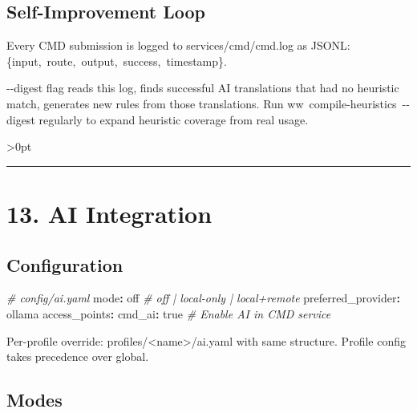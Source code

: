 \documentclass[11pt, a4paper, DIV=14]{scrartcl}
\renewcommand{\texttt}[1]{{\ttfamily\fontsize{8.5}{10.5}\selectfont\color{BabbNavy}#1}}
\newenvironment{Shaded}{%
  \vspace{4pt}%
  \begin{lrbox}{\ShadedBox}%
  \begin{minipage}{\dimexpr\linewidth-2\fboxsep\relax}%
  \vspace{4pt}%
}{%
  \vspace{4pt}%
  \end{minipage}%
  \end{lrbox}%
  \noindent\colorbox{CodeBg}{\usebox{\ShadedBox}}%
  \par\vspace{4pt}%
}
\newcommand{\AttributeTok}[1]{\textcolor{BabbTeal}{#1}}
\newcommand{\CharTok}[1]{#1}
\newcommand{\CommentTok}[1]{\textcolor{BabbGray}{\textit{#1}}}
\newcommand{\FunctionTok}[1]{\textcolor{BabbNavy}{#1}}
\newcommand{\KeywordTok}[1]{\textbf{#1}}
\newenvironment{Highlighting}{\ttfamily\fontsize{8.2}{11}\selectfont}{}
\let\origRule\rule
\renewcommand{\rule}[3][0pt]{%
  \ifnum\dimexpr#3\relax>0pt
    \par\vspace{2pt}\noindent{\color{BabbBorder}\origRule[#1]{#2}{#3}}\par\vspace{2pt}%
  \else
    \origRule[#1]{#2}{#3}%
  \fi
}
\begin{document}
\subsection{Self-Improvement Loop}\label{self-improvement-loop}

Every CMD submission is logged to \texttt{services/cmd/cmd.log} as
JSONL: \texttt{\{input,\ route,\ output,\ success,\ timestamp\}}.

\texttt{-\/-digest} flag reads this log, finds successful AI
translations that had no heuristic match, generates new rules from those
translations. Run \texttt{ww\ compile-heuristics\ -\/-digest} regularly
to expand heuristic coverage from real usage.

\begin{center}\rule{0.5\linewidth}{0.5pt}\end{center}

\section{13. AI Integration}\label{ai-integration}

\subsection{Configuration}\label{configuration}

\begin{Shaded}
\begin{Highlighting}[]
\CommentTok{\# config/ai.yaml}
\FunctionTok{mode}\KeywordTok{:}\AttributeTok{ }\CharTok{off}\CommentTok{                    \# off | local{-}only | local+remote}
\FunctionTok{preferred\_provider}\KeywordTok{:}\AttributeTok{ ollama}
\FunctionTok{access\_points}\KeywordTok{:}
\AttributeTok{  }\FunctionTok{cmd\_ai}\KeywordTok{:}\AttributeTok{ }\CharTok{true}\CommentTok{               \# Enable AI in CMD service}
\end{Highlighting}
\end{Shaded}

Per-profile override:
\texttt{profiles/\textless{}name\textgreater{}/ai.yaml} with same
structure. Profile config takes precedence over global.

\subsection{Modes}\label{modes}
\end{document}
